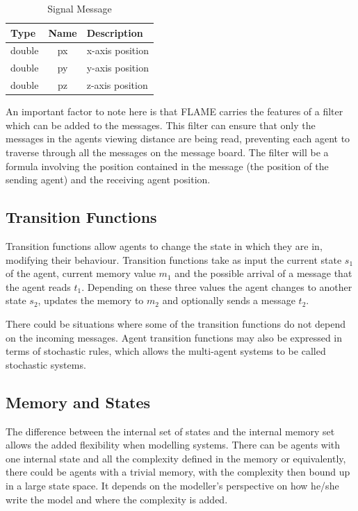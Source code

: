\begin{table}[ht]
\centering
\begin{tabular}{|l||c||l|}
\hline
Type&Name&Description\\
\hline \hline
double&px&x-axis position\\
\hline
double&py&y-axis position\\
\hline
double&pz&z-axis position\\
\hline
\end{tabular}
\caption{Signal Message}
\label{tab:signal_message}
\end{table}


An important factor to note here is that FLAME carries the features of a filter which can be added to the messages. This filter can ensure that only the messages in the agents viewing distance are being read, preventing each agent to traverse through all the messages on the message board. The filter will be a formula involving the position contained in the
message (the position of the sending agent) and the receiving agent position.


\subsection{Transition Functions}
 Transition functions allow agents to change the state in
 which they are in, modifying their behaviour. Transition functions take as input the current state $s_{1}$ of the agent, current memory value
 $m_{1}$ and the possible arrival of a message that the agent reads  $t_{1}$. Depending on these three values the agent changes to another state $s_{2}$, updates the memory to $m_{2}$ and
 optionally sends a message $t_{2}$. 
 
 
There could be situations where some of the transition functions do not depend on the incoming
 messages. Agent transition functions may also be expressed in terms of
 stochastic rules, which allows the multi-agent systems to be called stochastic systems.

 \subsection{Memory and States}
 The difference between the internal set of states and the internal
 memory set allows the added flexibility when modelling systems.
 There can be agents with one internal state and all the complexity
 defined in the memory or equivalently, there could be agents with
 a trivial memory, with the complexity then bound up in a large state
 space. It depends on the modeller's perspective on how he/she write the model and where the complexity is added.

